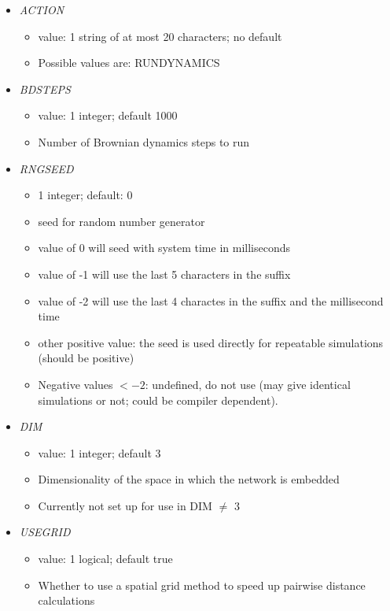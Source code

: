 \documentclass[12pt]{article}
\begin{document}
\begin{itemize}
%
\item {\it ACTION}
  \begin{itemize}
    \item  value: 1 string of at most 20 characters; no default
    \item Possible values are: RUNDYNAMICS
  \end{itemize}
%
\item {\it BDSTEPS}
  \begin{itemize}
    \item  value: 1 integer; default 1000
    \item Number of Brownian dynamics steps to run
  \end{itemize}
%
\item {\it RNGSEED}
  \begin{itemize}
    \item 1 integer; default: $0$
    \item seed for random number generator
    \item value of 0 will seed with system time in milliseconds
    \item value of -1 will use the last 5 characters in the suffix
    \item value of -2 will use the last 4 charactes in the suffix and the millisecond time
    \item other positive value: the seed is used directly for repeatable simulations (should be positive)
    \item Negative values $< -2$: undefined, do not use (may give identical simulations or not; could be compiler dependent).
  \end{itemize}
%
\item {\it DIM}
  \begin{itemize}
    \item  value: 1 integer; default 3
    \item Dimensionality of the space in which the network is embedded
    \item Currently not set up for use in DIM $\ne$ 3
  \end{itemize}
%
\item {\it USEGRID}
  \begin{itemize}
    \item  value: 1 logical; default true
    \item Whether to use a spatial grid method to speed up pairwise distance calculations
  \end{itemize}
%

\end{itemize}
\end{document}
